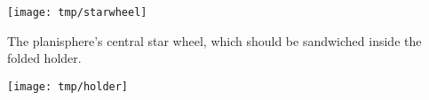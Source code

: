 \documentclass[a4paper,onecolumn,10pt]{article}
\begin{document}

\centerline{\texttt{[image: tmp/starwheel]}}

\vspace{1cm}
The planisphere's central star wheel, which should be sandwiched inside the folded holder.

\newpage
\thispagestyle{empty}
\vspace*{-3.0cm}
\centerline{\texttt{[image: tmp/holder]}}


\end{document}
